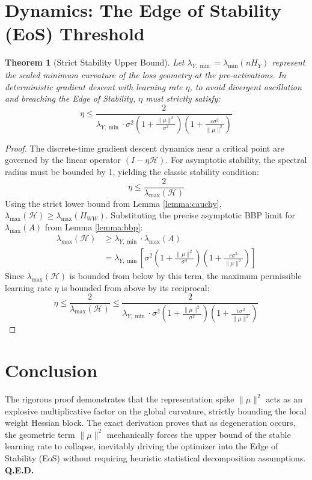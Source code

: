 \documentclass[11pt, a4paper]{article}
\newtheorem{theorem}{Theorem}
\begin{document}
\section{Dynamics: The Edge of Stability (EoS) Threshold}

\begin{theorem}[Strict Stability Upper Bound]
Let $\lambda_{Y,\min} = \lambda_{\min}(n H_Y)$ represent the scaled minimum curvature of the loss geometry at the pre-activations. In deterministic gradient descent with learning rate $\eta$, to avoid divergent oscillation and breaching the Edge of Stability, $\eta$ must strictly satisfy:
\begin{equation}
    \eta \le \frac{2}{\lambda_{Y,\min} \cdot \sigma^2 \left( 1 + \frac{\|\mu\|^2}{\sigma^2} \right) \left( 1 + \frac{c \sigma^2}{\|\mu\|^2} \right)}
\end{equation}
\end{theorem}

\begin{proof}
The discrete-time gradient descent dynamics near a critical point are governed by the linear operator $(I - \eta \mathcal{H})$. For asymptotic stability, the spectral radius must be bounded by 1, yielding the classic stability condition:
\begin{equation}
    \eta \le \frac{2}{\lambda_{\max}(\mathcal{H})}
\end{equation}
Using the strict lower bound from Lemma \ref{lemma:cauchy}, $\lambda_{\max}(\mathcal{H}) \ge \lambda_{\max}(H_{WW})$. Substituting the precise asymptotic BBP limit for $\lambda_{\max}(A)$ from Lemma \ref{lemma:bbp}:
\begin{align}
    \lambda_{\max}(\mathcal{H}) &\ge \lambda_{Y,\min} \cdot \lambda_{\max}(A) \\
    &= \lambda_{Y,\min} \left[ \sigma^2 \left( 1 + \frac{\|\mu\|^2}{\sigma^2} \right) \left( 1 + \frac{c \sigma^2}{\|\mu\|^2} \right) \right]
\end{align}
Since $\lambda_{\max}(\mathcal{H})$ is bounded from below by this term, the maximum permissible learning rate $\eta$ is bounded from above by its reciprocal:
\begin{equation}
    \eta \le \frac{2}{\lambda_{\max}(\mathcal{H})} \le \frac{2}{\lambda_{Y,\min} \cdot \sigma^2 \left( 1 + \frac{\|\mu\|^2}{\sigma^2} \right) \left( 1 + \frac{c \sigma^2}{\|\mu\|^2} \right)}
\end{equation}
\end{proof}

\section{Conclusion}
The rigorous proof demonstrates that the representation spike $\|\mu\|^2$ acts as an explosive multiplicative factor on the global curvature, strictly bounding the local weight Hessian block. The exact derivation proves that as degeneration occurs, the geometric term $\|\mu\|^2$ mechanically forces the upper bound of the stable learning rate to collapse, inevitably driving the optimizer into the Edge of Stability (EoS) without requiring heuristic statistical decomposition assumptions. \textbf{Q.E.D.}
\end{document}
